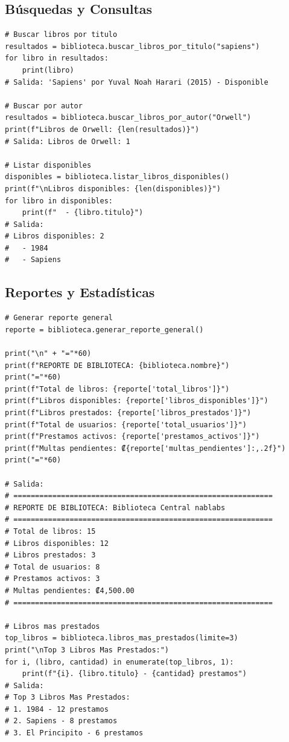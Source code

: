 \documentclass[11pt,letterpaper]{article}
\begin{document}
\subsection{Búsquedas y Consultas}

\begin{lstlisting}[caption={Ejemplo de búsquedas}]
# Buscar libros por titulo
resultados = biblioteca.buscar_libros_por_titulo("sapiens")
for libro in resultados:
    print(libro)
# Salida: 'Sapiens' por Yuval Noah Harari (2015) - Disponible

# Buscar por autor
resultados = biblioteca.buscar_libros_por_autor("Orwell")
print(f"Libros de Orwell: {len(resultados)}")
# Salida: Libros de Orwell: 1

# Listar disponibles
disponibles = biblioteca.listar_libros_disponibles()
print(f"\nLibros disponibles: {len(disponibles)}")
for libro in disponibles:
    print(f"  - {libro.titulo}")
# Salida:
# Libros disponibles: 2
#   - 1984
#   - Sapiens
\end{lstlisting}

\subsection{Reportes y Estadísticas}

\begin{lstlisting}[caption={Ejemplo de generación de reportes}]
# Generar reporte general
reporte = biblioteca.generar_reporte_general()

print("\n" + "="*60)
print(f"REPORTE DE BIBLIOTECA: {biblioteca.nombre}")
print("="*60)
print(f"Total de libros: {reporte['total_libros']}")
print(f"Libros disponibles: {reporte['libros_disponibles']}")
print(f"Libros prestados: {reporte['libros_prestados']}")
print(f"Total de usuarios: {reporte['total_usuarios']}")
print(f"Prestamos activos: {reporte['prestamos_activos']}")
print(f"Multas pendientes: ₡{reporte['multas_pendientes']:,.2f}")
print("="*60)

# Salida:
# ============================================================
# REPORTE DE BIBLIOTECA: Biblioteca Central nablabs
# ============================================================
# Total de libros: 15
# Libros disponibles: 12
# Libros prestados: 3
# Total de usuarios: 8
# Prestamos activos: 3
# Multas pendientes: ₡4,500.00
# ============================================================

# Libros mas prestados
top_libros = biblioteca.libros_mas_prestados(limite=3)
print("\nTop 3 Libros Mas Prestados:")
for i, (libro, cantidad) in enumerate(top_libros, 1):
    print(f"{i}. {libro.titulo} - {cantidad} prestamos")
# Salida:
# Top 3 Libros Mas Prestados:
# 1. 1984 - 12 prestamos
# 2. Sapiens - 8 prestamos
# 3. El Principito - 6 prestamos
\end{lstlisting}
\end{document}
